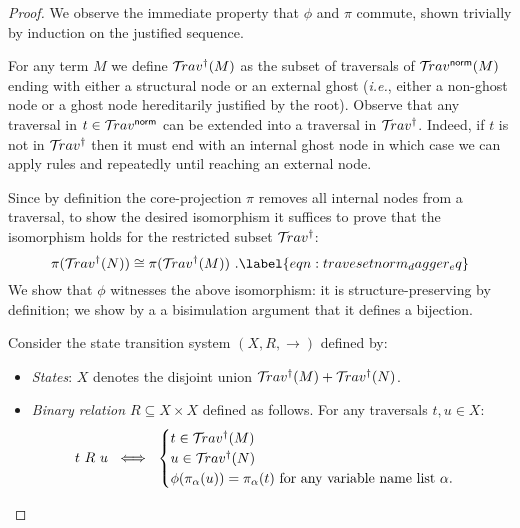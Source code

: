 \documentclass{article}
\makeatletter
\theoremstyle{definition}
\newcommand{\normalizing}{{\sf norm}}
\newcommand{\travsetnorm}{\travset^\normalizing}
\def\coresymbol{\pi} %
\renewcommand\ie{{\it i.e.\@\xspace}}
\makeatother
\begin{document}
\begin{proof}
We observe the immediate property that $\phi$ and $\coresymbol$ commute, shown trivially by induction on the justified sequence.


For any term $M$ we define $\mathcal{T}\!rav^\dagger(M)$ as the subset of traversals of $\travsetnorm(M)$ ending with either a structural node or an external ghost (\ie, either a non-ghost node or a ghost node hereditarily justified by the root). Observe that any traversal in $t\in\travsetnorm$ can be extended into a traversal in $\mathcal{T}\!rav^\dagger$. Indeed, if $t$ is not in
$\mathcal{T}\!rav^\dagger$ then it must end with an internal ghost node in which case we can apply rules  and  repeatedly until reaching an external node.

Since by definition the core-projection $\coresymbol$ removes all internal nodes from a traversal, to show the desired isomorphism it suffices to prove that the isomorphism holds for the restricted subset $\mathcal{T}\!rav^\dagger$:
\begin{equation}
\coresymbol(\travset^\dagger(N)) \cong \coresymbol(\travset^\dagger(M))
\ .\label{eqn:travesetnorm_dagger_eq}
\end{equation}
We show that $\phi$ witnesses the above isomorphism: it is structure-preserving by definition; we show by a a bisimulation argument that it defines a bijection.

Consider the state transition system $(X, R, \rightarrow)$ defined by:
\begin{itemize}
    \item \emph{States}: $X$ denotes the disjoint union $\mathcal{T}\!rav^\dagger(M) + \mathcal{T}\!rav^\dagger(N)$.

    \item \emph{Binary relation $R\subseteq X \times X$} defined as follows. For any traversals $t, u \in X$:
    $$ t~R~u  \ \iff \ \begin{cases}
        t\in\travset^\dagger(M)\\
         u\in\travset^\dagger(N) \\
         \phi(\coresymbol_\alpha(u)) = \coresymbol_\alpha(t) \mbox{ for any  variable name list $\alpha$}.
    \end{cases}
    $$


\end{itemize}
\end{proof}
\end{document}
